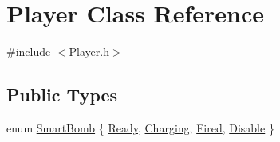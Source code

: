 \hypertarget{class_player}{}\section{Player Class Reference}
\label{class_player}


{\ttfamily \#include $<$Player.\+h$>$}

\subsection*{Public Types}
\begin{DoxyCompactItemize}
\item 
enum \hyperlink{class_player_afd539a18e0e4c3bbf07c820914c0511e}{Smart\+Bomb} \{ \hyperlink{class_player_afd539a18e0e4c3bbf07c820914c0511ea62fc7d85d72db94f418347b5e3a25d28}{Ready}, 
\hyperlink{class_player_afd539a18e0e4c3bbf07c820914c0511ea86d19f9b31edc54d666dd859955f2ae4}{Charging}, 
\hyperlink{class_player_afd539a18e0e4c3bbf07c820914c0511eaefb39c3c6842102cf73bd0203e41b338}{Fired}, 
\hyperlink{class_player_afd539a18e0e4c3bbf07c820914c0511ea0dc1ade8c7310201d494698675fd011d}{Disable}
 \}
\end{DoxyCompactItemize}
